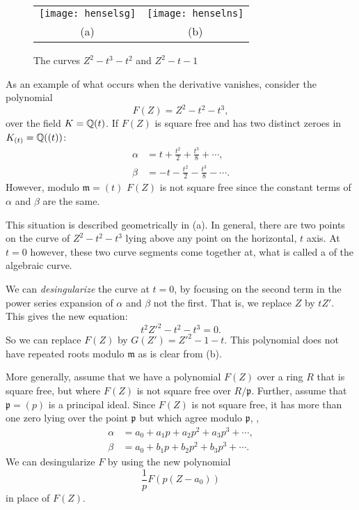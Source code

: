 {\begin{figure}
\begin{center}
\begin{tabular}{cc}
\texttt{[image: henselsg]} &
\texttt{[image: henselns]} \\
(a) & (b)
\end{tabular}
\end{center}
\caption{The curves $Z^2 - t^3 -t^2$ and $Z^2 - t -1$
 \label{HenselSing:Fig}}
\end{figure}

As an example of what occurs when the derivative vanishes, consider
the polynomial
\[
F(Z) = Z^2 - t^2 - t^3,
\]
over the field $K = \mathbb{Q}(t)$.  If $F(Z)$ is square free and has two
distinct zeroes in $K_{(t)} = \mathbb{Q}((t))$:
\[
\begin{aligned}
\alpha & = t + \frac{t^2}{2} + \frac{t^3}{8} + \cdots, \\
\beta & =  - t - \frac{t^2}{2} - \frac{t^3}{8} - \cdots.
\end{aligned}
\]
However, modulo $\mathfrak{m} = (t)$ $F(Z)$ is not square free since the
constant terms of $\alpha$ and $\beta$ are the same.  

This situation is described geometrically in
(a).  In general, there are two points on the 
curve of $Z^2 - t^2 - t^3$ lying above any point on the horizontal,
$t$ axis.  At $t=0$ however, these two curve segments come together
at, what is called a  of the algebraic curve.

We can {\em desingularize} the curve at $t=0$, by focusing on the
second term in the power series expansion of $\alpha$ and $\beta$ not
the first.  That is, we replace $Z$ by $t Z'$.  This gives the new
equation:
\[
t^2 {Z'}^2 - t^2 -t^3 = 0.  
\]
So we can replace $F(Z)$ by $G(Z') = {Z'}^2 - 1 -t$.  This polynomial does
not have repeated roots modulo $\mathfrak{m}$ as is clear from
(b). 

More generally, assume that we have a polynomial $F(Z)$ over a ring
$R$ that is square free, but where $F(Z)$ is not square free over
$R/\mathfrak{p}$.  Further, assume that $\mathfrak{p} = (p)$ is a principal
ideal.  Since $F(Z)$ is not square free, it has more than one zero
lying over the point $\mathfrak{p}$ but which agree modulo $\mathfrak{p}$,
\eg,
\[
\begin{aligned}
\alpha & = a_0 + a_1 p + a_2 p^2 + a_3 p^3 + \cdots, \\
\beta  & = a_0 + b_1 p + b_2 p^2 + b_3 p^3 + \cdots.
\end{aligned}
\]
We can desingularize $F$ by using the new polynomial
\[
\frac{1}{p} F(p(Z - a_0))
\]
in place of $F(Z)$.  

}
